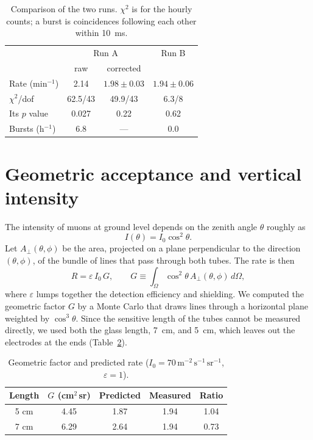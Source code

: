 \documentclass[aip,ajp,amsmath,amssymb,reprint]{revtex4-2}
\newcommand{\Iunit}{\,\mathrm{m^{-2}\,s^{-1}\,sr^{-1}}}
\begin{document}
\begin{table}[t]
\caption{Comparison of the two runs. $\chi^2$ is for the hourly counts; a burst is coincidences following each other within 10~ms.}
\label{tab:compare}
\begin{ruledtabular}
\begin{tabular}{lccc}
 & \multicolumn{2}{c}{Run A} & Run B \\
 & raw & corrected & \\
\hline
Rate (min$^{-1}$) & 2.14 & $1.98 \pm 0.03$ & $1.94 \pm 0.06$ \\
$\chi^2$/dof & 62.5/43 & 49.9/43 & 6.3/8 \\
Its $p$ value & 0.027 & 0.22 & 0.62 \\
Bursts (h$^{-1}$) & 6.8 & --- & 0.0 \\
\end{tabular}
\end{ruledtabular}
\end{table}

\section{Geometric acceptance and vertical intensity}

The intensity of muons at ground level depends on the zenith angle $\theta$ roughly as\cite{pdg}
\begin{equation}
I(\theta) = I_0 \cos^2\theta . \label{eq:cos2}
\end{equation}
Let $A_\perp(\theta,\phi)$ be the area, projected on a plane perpendicular to the direction $(\theta,\phi)$, of the bundle of lines that pass through both tubes. The rate is then
\begin{equation}
R = \varepsilon\, I_0\, G, \qquad G \equiv \int_\Omega \cos^2\theta\, A_\perp(\theta,\phi)\, d\Omega , \label{eq:G}
\end{equation}
where $\varepsilon$ lumps together the detection efficiency and shielding. We computed the geometric factor $G$ by a Monte Carlo that draws lines through a horizontal plane weighted by $\cos^3\theta$. Since the sensitive length of the tubes cannot be measured directly, we used both the glass length, 7~cm, and 5~cm, which leaves out the electrodes at the ends (Table~\ref{tab:geo}).

\begin{table}[t]
\caption{Geometric factor and predicted rate ($I_0 = 70\Iunit$, $\varepsilon = 1$).}
\label{tab:geo}
\begin{ruledtabular}
\begin{tabular}{ccccc}
Length & $G$ (cm$^2$\,sr) & Predicted & Measured & Ratio \\
\hline
5 cm & 4.45 & 1.87 & 1.94 & 1.04 \\
7 cm & 6.29 & 2.64 & 1.94 & 0.73 \\
\end{tabular}
\end{ruledtabular}
\end{table}
\end{document}
